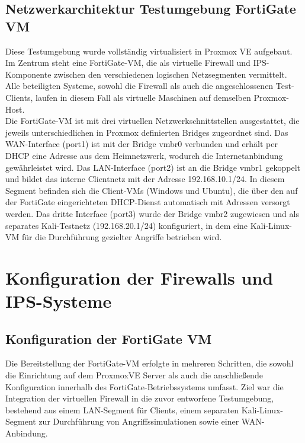 \subsection{Netzwerkarchitektur Testumgebung FortiGate VM}
Diese Testumgebung wurde vollständig virtualisiert in Proxmox VE aufgebaut. Im Zentrum steht eine FortiGate-VM, die als virtuelle Firewall und IPS-Komponente zwischen den verschiedenen logischen Netzsegmenten vermittelt. Alle beteiligten Systeme, sowohl die Firewall als auch die angeschlossenen Test-Clients, laufen in diesem Fall als virtuelle Maschinen auf demselben Proxmox-Host.\\
Die FortiGate-VM ist mit drei virtuellen Netzwerkschnittstellen ausgestattet, die jeweils unterschiedlichen in Proxmox definierten Bridges zugeordnet sind. Das WAN-Interface (port1) ist mit der Bridge vmbr0 verbunden und erhält per DHCP eine Adresse aus dem Heimnetzwerk, wodurch die Internetanbindung gewährleistet wird. Das LAN-Interface (port2) ist an die Bridge vmbr1 gekoppelt und bildet das interne Clientnetz mit der Adresse 192.168.10.1/24. In diesem Segment befinden sich die Client-VMs (Windows und Ubuntu), die über den auf der FortiGate eingerichteten DHCP-Dienst automatisch mit Adressen versorgt werden. Das dritte Interface (port3) wurde der Bridge vmbr2 zugewiesen und als separates Kali-Testnetz (192.168.20.1/24) konfiguriert, in dem eine Kali-Linux-VM für die Durchführung gezielter Angriffe betrieben wird.

\section{Konfiguration der Firewalls und IPS-Systeme}
\subsection{Konfiguration der FortiGate VM}
Die Bereitstellung der FortiGate-VM erfolgte in mehreren Schritten, die sowohl die Einrichtung auf dem ProxmoxVE Server als auch die anschließende Konfiguration innerhalb des FortiGate-Betriebssystems umfasst. Ziel war die Integration der virtuellen Firewall in die zuvor entworfene Testumgebung, bestehend aus einem LAN-Segment für Clients, einem separaten Kali-Linux-Segment zur Durchführung von Angriffssimulationen sowie einer WAN-Anbindung.\\

